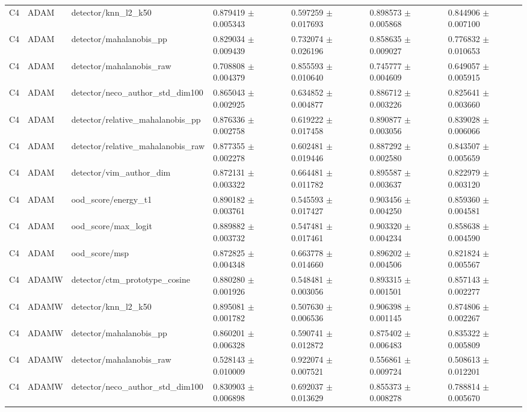 \begin{longtable}{lllllll}
C4 & ADAM & detector/knn\_l2\_k50 & 0.879419 $\pm$ 0.005343 & 0.597259 $\pm$ 0.017693 & 0.898573 $\pm$ 0.005868 & 0.844906 $\pm$ 0.007100 \\
C4 & ADAM & detector/mahalanobis\_pp & 0.829034 $\pm$ 0.009439 & 0.732074 $\pm$ 0.026196 & 0.858635 $\pm$ 0.009027 & 0.776832 $\pm$ 0.010653 \\
C4 & ADAM & detector/mahalanobis\_raw & 0.708808 $\pm$ 0.004379 & 0.855593 $\pm$ 0.010640 & 0.745777 $\pm$ 0.004609 & 0.649057 $\pm$ 0.005915 \\
C4 & ADAM & detector/neco\_author\_std\_dim100 & 0.865043 $\pm$ 0.002925 & 0.634852 $\pm$ 0.004877 & 0.886712 $\pm$ 0.003226 & 0.825641 $\pm$ 0.003660 \\
C4 & ADAM & detector/relative\_mahalanobis\_pp & 0.876336 $\pm$ 0.002758 & 0.619222 $\pm$ 0.017458 & 0.890877 $\pm$ 0.003056 & 0.839028 $\pm$ 0.006066 \\
C4 & ADAM & detector/relative\_mahalanobis\_raw & 0.877355 $\pm$ 0.002278 & 0.602481 $\pm$ 0.019446 & 0.887292 $\pm$ 0.002580 & 0.843507 $\pm$ 0.005659 \\
C4 & ADAM & detector/vim\_author\_dim & 0.872131 $\pm$ 0.003322 & 0.664481 $\pm$ 0.011782 & 0.895587 $\pm$ 0.003637 & 0.822979 $\pm$ 0.003120 \\
C4 & ADAM & ood\_score/energy\_t1 & 0.890182 $\pm$ 0.003761 & 0.545593 $\pm$ 0.017427 & 0.903456 $\pm$ 0.004250 & 0.859360 $\pm$ 0.004581 \\
C4 & ADAM & ood\_score/max\_logit & 0.889882 $\pm$ 0.003732 & 0.547481 $\pm$ 0.017461 & 0.903320 $\pm$ 0.004234 & 0.858638 $\pm$ 0.004590 \\
C4 & ADAM & ood\_score/msp & 0.872825 $\pm$ 0.004348 & 0.663778 $\pm$ 0.014660 & 0.896202 $\pm$ 0.004506 & 0.821824 $\pm$ 0.005567 \\
C4 & ADAMW & detector/ctm\_prototype\_cosine & 0.880280 $\pm$ 0.001926 & 0.548481 $\pm$ 0.003056 & 0.893315 $\pm$ 0.001501 & 0.857143 $\pm$ 0.002277 \\
C4 & ADAMW & detector/knn\_l2\_k50 & 0.895081 $\pm$ 0.001782 & 0.507630 $\pm$ 0.006536 & 0.906398 $\pm$ 0.001145 & 0.874806 $\pm$ 0.002267 \\
C4 & ADAMW & detector/mahalanobis\_pp & 0.860201 $\pm$ 0.006328 & 0.590741 $\pm$ 0.012872 & 0.875402 $\pm$ 0.006483 & 0.835322 $\pm$ 0.005809 \\
C4 & ADAMW & detector/mahalanobis\_raw & 0.528143 $\pm$ 0.010009 & 0.922074 $\pm$ 0.007521 & 0.556861 $\pm$ 0.009724 & 0.508613 $\pm$ 0.012201 \\
C4 & ADAMW & detector/neco\_author\_std\_dim100 & 0.830903 $\pm$ 0.006898 & 0.692037 $\pm$ 0.013629 & 0.855373 $\pm$ 0.008278 & 0.788814 $\pm$ 0.005670 \\

\end{longtable}
